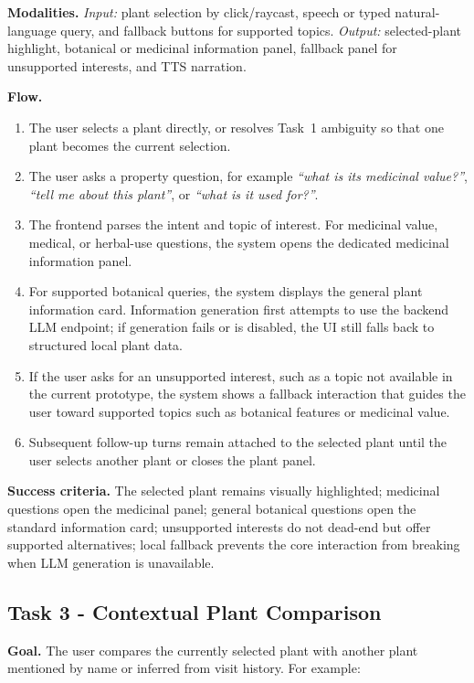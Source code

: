 \documentclass[12pt,a4paper]{article}
\newcommand{\tasksub}[1]{\par\smallskip\noindent\textbf{#1}\quad\ignorespaces}
\begin{document}
\tasksub{Modalities.} \emph{Input:} plant selection by click/raycast, speech
or typed natural-language query, and fallback buttons for supported topics.
\emph{Output:} selected-plant highlight, botanical or medicinal information
panel, fallback panel for unsupported interests, and TTS narration.

\tasksub{Flow.}
\begin{enumerate}
    \item The user selects a plant directly, or resolves Task~1 ambiguity so
    that one plant becomes the current selection.
    \item The user asks a property question, for example
    \emph{``what is its medicinal value?''}, \emph{``tell me about this
    plant''}, or \emph{``what is it used for?''}.
    \item The frontend parses the intent and topic of interest. For medicinal
    value, medical, or herbal-use questions, the system opens the dedicated
    medicinal information panel.
    \item For supported botanical queries, the system displays the general
    plant information card. Information generation first attempts to use the
    backend LLM endpoint; if generation fails or is disabled, the UI still
    falls back to structured local plant data.
    \item If the user asks for an unsupported interest, such as a topic not
    available in the current prototype, the system shows a fallback interaction
    that guides the user toward supported topics such as botanical features or
    medicinal value.
    \item Subsequent follow-up turns remain attached to the selected plant
    until the user selects another plant or closes the plant panel.
\end{enumerate}

\tasksub{Success criteria.} The selected plant remains visually highlighted;
medicinal questions open the medicinal panel; general botanical questions open
the standard information card; unsupported interests do not dead-end but offer
supported alternatives; local fallback prevents the core interaction from
breaking when LLM generation is unavailable.

\subsection{Task 3 - Contextual Plant Comparison}
\tasksub{Goal.} The user compares the currently selected plant with another
plant mentioned by name or inferred from visit history. For example:
\end{document}
